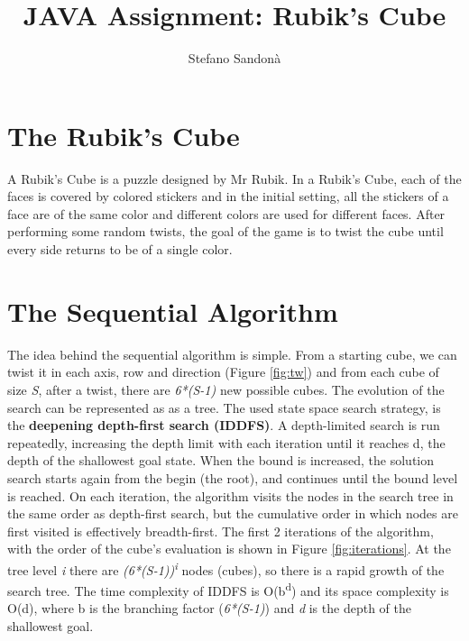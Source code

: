 \documentclass[a4paper]{article}
\begin{document}
\title{JAVA Assignment: Rubik's Cube}
\author{Stefano Sandonà}
\date{}
		
\maketitle

\section{The Rubik's Cube}
\label{sec:rubiks_cube}

A Rubik's Cube is a puzzle designed by Mr Rubik. In a Rubik's Cube, each of the faces is covered by colored stickers and in the initial setting, all the stickers of a face are of the same color and different colors are used for different faces. After performing some random twists, the goal of the game is to twist the cube until every side returns to be of a single color. 

\section{The Sequential Algorithm}
\label{sec:seq_algo}
The idea behind the sequential algorithm is simple. From a starting cube, we can twist it in each axis, row and direction (Figure \ref{fig:tw}) and from each cube of size \textit{S}, after a twist, there are \textit{6*(S-1)} new possible cubes. The evolution of the search can be represented as as a tree. 
The used state space search strategy, is the \textbf{deepening depth-first search (IDDFS)}. A depth-limited search is run repeatedly, increasing the depth limit with each iteration until it reaches d, the depth of the shallowest goal state. When the bound is increased, the solution search starts again from the begin (the root), and continues until the bound level is reached. On each iteration, the algorithm visits the nodes in the search tree in the same order as depth-first search, but the cumulative order in which nodes are first visited is effectively breadth-first. The first 2 iterations of the algorithm, with the order of the cube's evaluation is shown in Figure \ref{fig:iterations}. At the tree level \textit{i} there are \textit{(6*(S-1))\textsuperscript{i}} nodes (cubes), so there is a rapid growth of the search tree. The time complexity of IDDFS is O(b\textsuperscript{d}) and its space complexity is O(d), where b is the branching factor (\textit{6*(S-1)}) and \textit{d} is the depth of the shallowest goal.
\end{document}
